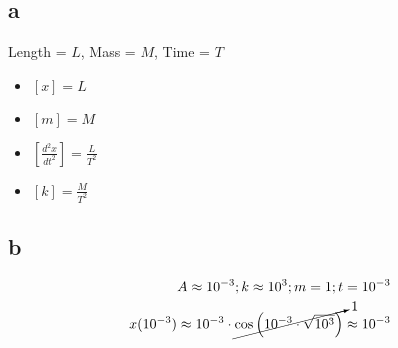 \subsection{a}
Length = $L$, Mass = $M$, Time = $T$
\begin{itemize}
    \item $[x] = L$
    \item $[m] = M$
    \item $[\frac{d^2x}{dt^2}] = \frac{L}{T^2}$
    \item $[k] = \frac{M}{T^2}$
\end{itemize}

\subsection{b}
\begin{equation}
\begin{split}
    A \approx 10^{-3}; k \approx 10^3; m = 1; t=10^{-3} \\
    x(10^{-3}) \approx 10^{-3} \cdot \cancelto{1}{\cos \left( 10^{-3} \cdot \sqrt{10^3} \right)} \approx 10^{-3}
\end{split}
\end{equation}